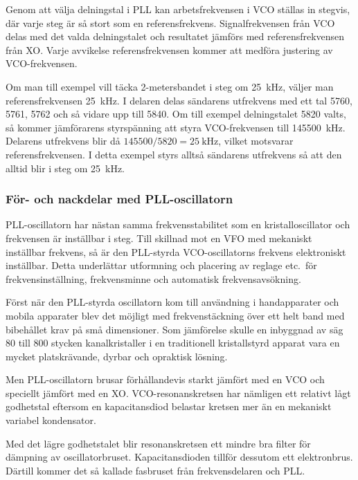 Genom att välja delningstal i PLL kan arbetsfrekvensen i VCO ställas
in stegvis, där varje steg är så stort som en referensfrekvens.
Signalfrekvensen från VCO delas med det valda delningstalet och resultatet
jämförs med referensfrekvensen från XO.
Varje avvikelse referensfrekvensen kommer att medföra justering av
VCO-frekvensen.

Om man till exempel vill täcka 2-metersbandet i steg om \qty{25}{\kilo\hertz},
väljer man referensfrekvensen \qty{25}{\kilo\hertz}.
I delaren delas sändarens utfrekvens med ett tal 5760, 5761, 5762 och så vidare
upp till 5840.
Om till exempel delningstalet 5820 valts, så kommer jämförarens styrspänning att
styra VCO-frekvensen till \qty{145500}{\kilo\hertz}.
Delarens utfrekvens blir då \(145500/5820 = \qty{25}{\kilo\hertz}\), vilket
motsvarar referensfrekvensen.
I detta exempel styrs alltså sändarens utfrekvens så att den alltid blir i steg
om \qty{25}{\kilo\hertz}.

\subsubsection{För- och nackdelar med PLL-oscillatorn}

PLL-oscillatorn har nästan samma frekvensstabilitet som en
kristalloscillator och frekvensen är inställbar i steg.
Till skillnad mot en VFO med mekaniskt inställbar frekvens, så är den PLL-styrda
VCO-oscillatorns frekvens elektroniskt inställbar.
Detta underlättar utformning och placering av reglage etc.\ för
frekvensinställning, frekvensminne och automatisk frekvensavsökning.

Först när den PLL-styrda oscillatorn kom till användning i handapparater och
mobila apparater blev det möjligt med frekvenstäckning över ett helt band med
bibehållet krav på små dimensioner.
Som jämförelse skulle en inbyggnad av säg 80 till 800 stycken kanalkristaller
i en traditionell kristallstyrd apparat vara en mycket platskrävande, dyrbar
och opraktisk lösning.

Men PLL-oscillatorn brusar förhållandevis starkt jämfört med en VCO och
speciellt jämfört med en XO.
VCO-resonanskretsen har nämligen ett relativt lågt godhetstal eftersom en
kapacitansdiod belastar kretsen mer än en mekaniskt variabel kondensator.

Med det lägre godhetstalet blir resonanskretsen ett mindre bra
filter för dämpning av oscillatorbruset.
Kapacitansdioden tillför dessutom ett elektronbrus.
Därtill kommer det så kallade fasbruset från frekvensdelaren och PLL.


